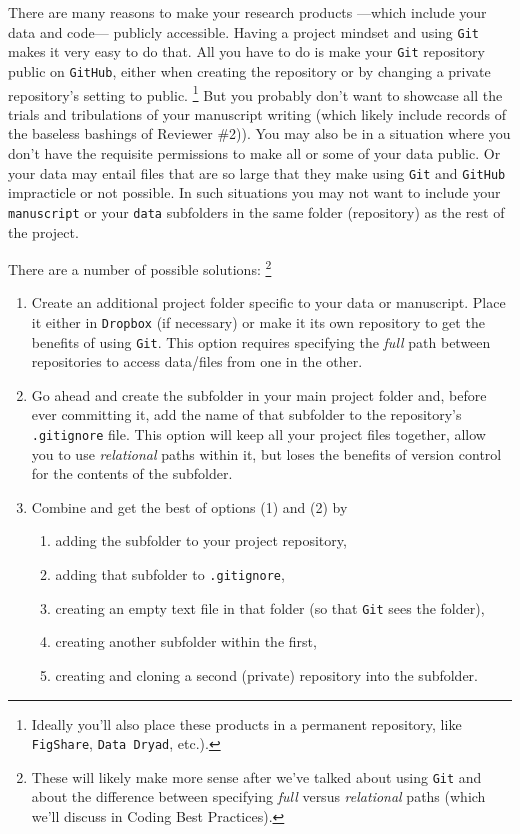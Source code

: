 \documentclass[12pt,letterpaper]{article}
\begin{document}
There are many reasons to make your research products
---which include your data and code---
publicly accessible.
Having a project mindset and using \texttt{Git} makes it very easy to do that.
All you have to do is make your \texttt{Git} repository public on \texttt{GitHub},
either when creating the repository or by changing a private repository's setting to public.
\unskip
\footnote{Ideally you'll also place these products in a permanent repository, like \texttt{FigShare}, \texttt{Data Dryad}, etc.).}
But you probably don't want to showcase all the trials and tribulations of your manuscript writing
(which likely include records of the baseless bashings of Reviewer \#2)).
You may also be in a situation where you don't have the requisite permissions to make all or some of your data public.
Or your data may entail files that are so large that they make using \texttt{Git} and \texttt{GitHub} impracticle or not possible.
In such situations you may not want to include your \texttt{manuscript} or your \texttt{data} subfolders in the same folder (repository) as the rest of the project.

There are a number of possible solutions:
\unskip
\footnote{These will likely make more sense after we've talked about using \texttt{Git} 
and about the difference between specifying \emph{full} versus \emph{relational} paths
(which we'll discuss in Coding Best Practices).}

\begin{enumerate}
\item Create an additional project folder specific to your data or manuscript.  
Place it either in \texttt{Dropbox} (if necessary) or make it its own repository to get the benefits of using \texttt{Git}.  
This option requires specifying the \emph{full} path between repositories to access data/files from one in the other. 
\item  Go ahead and create the subfolder in your main project folder and, 
before ever committing it, 
add the name of that subfolder to the repository's \texttt{.gitignore} file.
This option will keep all your project files together, allow you to use \emph{relational} paths within it, 
but loses the benefits of version control for the contents of the subfolder. 

\item  Combine and get the best of options (1) and (2) by
\begin{enumerate}
	\item adding the subfolder to your project repository,
	\item adding that subfolder to \texttt{.gitignore},
	\item creating an empty text file in that folder (so that \texttt{Git} sees the folder),
	\item creating another subfolder within the first,
	\item creating and cloning a second (private) repository into the subfolder.
\end{enumerate}
\end{enumerate}
\end{document}
